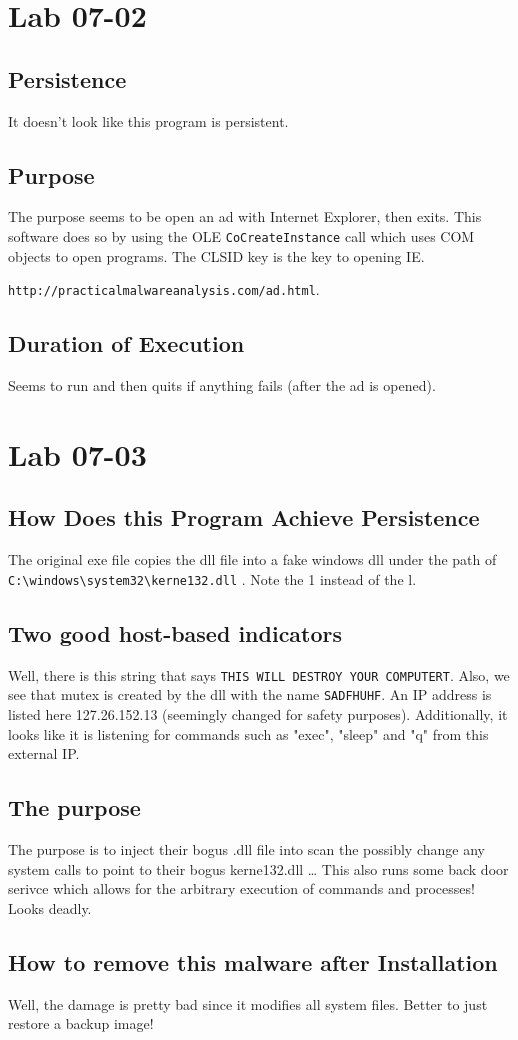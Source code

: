 \documentclass[11pt]{article}
\begin{document}
\section{Lab 07-02}
\label{sec-3}
\subsection{Persistence}
\label{sec-3-1}
It doesn't look like this program is persistent.      
\subsection{Purpose}
\label{sec-3-2}
The purpose seems to be open an ad with Internet Explorer, then exits. This
software does so by using the OLE \texttt{CoCreateInstance} call which uses COM
objects to open programs. The CLSID key is the key to opening IE. 

\texttt{http://practicalmalwareanalysis.com/ad.html}.  
\subsection{Duration of Execution}
\label{sec-3-3}
Seems to run and then quits if anything fails (after the ad is opened).
\section{Lab 07-03}
\label{sec-4}
\subsection{How Does this Program Achieve Persistence}
\label{sec-4-1}
The original exe file copies the dll file into a fake windows dll under the
path of \texttt{C:\textbackslash{}windows\textbackslash{}system32\textbackslash{}kerne132.dll} . Note the 1 instead of the l.
\subsection{Two good host-based indicators}
\label{sec-4-2}
Well, there is this string that says \texttt{THIS WILL DESTROY YOUR COMPUTERT}.
Also, we see that mutex is created by the dll with the name \texttt{SADFHUHF}. An
IP address is listed here 127.26.152.13 (seemingly changed for safety
purposes). Additionally, it looks like it is listening for commands such as
"exec", "sleep" and "q" from this external IP. 
\subsection{The purpose}
\label{sec-4-3}
The purpose is to inject their bogus .dll file into scan the possibly change
any system calls to point to their bogus kerne132.dll \ldots{} This also runs some
back door serivce which allows for the arbitrary execution of commands and
processes! Looks deadly.            
\subsection{How to remove this malware after Installation}
\label{sec-4-4}
Well, the damage is pretty bad since it modifies all system files. Better to
just restore a backup image! 
\end{document}
